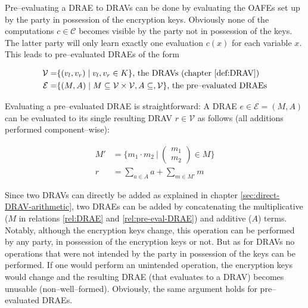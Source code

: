 Pre--evaluating a DRAE to DRAVs can be done by evaluating the OAFEs set up by
the party in possession of the encryption keys. Obviously none of the
computations $c \in \mathcal{C}$ becomes visible by the party not in possession
of the keys. The latter party will only learn exactly one evaluation $c(x)$ for
each variable $x$. This leads to pre--evaluated DRAEs of the form

\begin{align}
  \mathcal{V} = & \{ (v_l, v_r) \mid v_l, v_r \in K \}
  \text{, the DRAVs (chapter \ref{def:DRAV})} \nonumber\\
%
  \label{rel:pre-eval-DRAE}
  \mathcal{E} = & \{ (M, A) \mid
      M \subseteq \mathcal{V} \times \mathcal{V}, A \subseteq, \mathcal{V} \}
      \text{, the pre--evaluated DRAEs}
\end{align}

Evaluating a pre--evaluated DRAE is straightforward: A DRAE $e \in \mathcal{E} =
(M,A)$ can be evaluated to its single resulting DRAV $r \in \mathcal{V}$ as
follows (all additions performed component--wise):

\begin{align*}
M' &= \Bigg\{ m_1 \cdot m_2\ \Bigg|\ \begin{pmatrix}m_1\\m_2\end{pmatrix}
\in M \Bigg\} \\
r & = \sum_{a \in A}a + \sum_{m \in M'}m
\end{align*}




Since two DRAVs can directly be added as explained in chapter
\ref{sec:direct-DRAV-arithmetic}, two DRAEs can be added by concatenating the
multiplicative ($M$ in relations \ref{rel:DRAE} and \ref{rel:pre-eval-DRAE}) and
additive ($A$) terms. Notably, although the encryption keys change, this
operation can be performed by any party, in possession of the encryption keys or
not. But as for DRAVs no operations that were not intended by the party in
possession of the keys can be performed. If one would perform an unintended
operation, the encryption keys would change and the resulting DRAE (that
evaluates to a DRAV) becomes unusable (non--well--formed). Obviously, the same
argument holds for pre--evaluated DRAEs.



